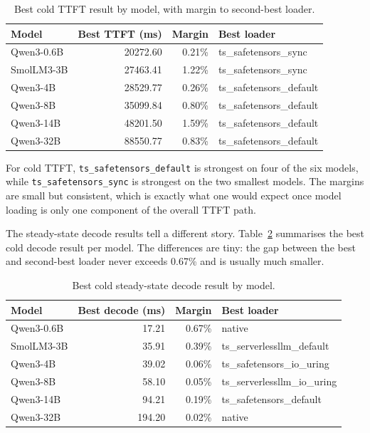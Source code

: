 \begin{table}[h]
\caption{Best cold TTFT result by model, with margin to second-best loader.}
\label{tab:vllm-ttft}
\centering
\begin{tabular}{lrrl}
\toprule
Model & Best TTFT (ms) & Margin & Best loader \\
\midrule
Qwen3-0.6B & 20272.60 & 0.21\% & ts\_safetensors\_sync \\
SmolLM3-3B & 27463.41 & 1.22\% & ts\_safetensors\_sync \\
Qwen3-4B & 28529.77 & 0.26\% & ts\_safetensors\_default \\
Qwen3-8B & 35099.84 & 0.80\% & ts\_safetensors\_default \\
Qwen3-14B & 48201.50 & 1.59\% & ts\_safetensors\_default \\
Qwen3-32B & 88550.77 & 0.83\% & ts\_safetensors\_default \\
\bottomrule
\end{tabular}
\end{table}

For cold TTFT, \texttt{ts\_safetensors\_default} is strongest on four of the six models, while \texttt{ts\_safetensors\_sync} is strongest on the two smallest models. The margins are small but consistent, which is exactly what one would expect once model loading is only one component of the overall TTFT path.

The steady-state decode results tell a different story. Table~\ref{tab:vllm-decode} summarises the best cold decode result per model. The differences are tiny: the gap between the best and second-best loader never exceeds 0.67\% and is usually much smaller.

\begin{table}[h]
\caption{Best cold steady-state decode result by model.}
\label{tab:vllm-decode}
\centering
\begin{tabular}{lrrl}
\toprule
Model & Best decode (ms) & Margin & Best loader \\
\midrule
Qwen3-0.6B & 17.21 & 0.67\% & native \\
SmolLM3-3B & 35.91 & 0.39\% & ts\_serverlessllm\_default \\
Qwen3-4B & 39.02 & 0.06\% & ts\_safetensors\_io\_uring \\
Qwen3-8B & 58.10 & 0.05\% & ts\_serverlessllm\_io\_uring \\
Qwen3-14B & 94.21 & 0.19\% & ts\_safetensors\_default \\
Qwen3-32B & 194.20 & 0.02\% & native \\
\bottomrule
\end{tabular}
\end{table}

